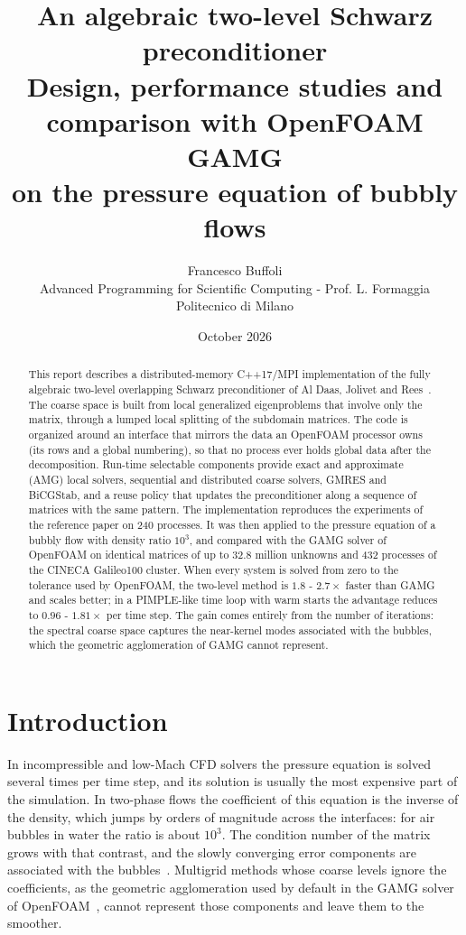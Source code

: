 \documentclass[11pt,a4paper]{article}
\title{\textbf{An algebraic two-level Schwarz preconditioner}\\[4pt]
\large Design, performance studies and comparison with OpenFOAM GAMG\\ on the pressure equation of bubbly flows}
\author{Francesco Buffoli\\[2pt]
\small Advanced Programming for Scientific Computing - Prof. L. Formaggia\\
\small Politecnico di Milano}
\date{October 2026}
\begin{document}
\maketitle

\begin{abstract}
\noindent
This report describes a distributed-memory C++17/MPI implementation of the fully
algebraic two-level overlapping Schwarz preconditioner of Al Daas, Jolivet and Rees~\cite{AlDaas2023}.
The coarse space is built from local generalized eigenproblems that involve only the matrix, through a
lumped local splitting of the subdomain matrices. The code is organized around an interface that mirrors
the data an OpenFOAM processor owns (its rows and a global numbering), so that no process ever holds
global data after the decomposition. Run-time selectable components provide exact and approximate (AMG)
local solvers, sequential and distributed coarse solvers, GMRES and BiCGStab, and a reuse policy that
updates the preconditioner along a sequence of matrices with the same pattern. The implementation
reproduces the experiments of the reference paper on 240 processes. It was then applied to the pressure
equation of a bubbly flow with density ratio $10^3$, and compared with the GAMG solver of OpenFOAM on
identical matrices of up to $32.8$ million unknowns and 432 processes of the CINECA Galileo100 cluster.
When every system is solved from zero to the tolerance used by OpenFOAM, the two-level method is
$1.8$ - $2.7\times$ faster than GAMG and scales better; in a PIMPLE-like time loop with warm starts the
advantage reduces to $0.96$ - $1.81\times$ per time step. The gain comes entirely from the number of
iterations: the spectral coarse space captures the near-kernel modes associated with the bubbles, which
the geometric agglomeration of GAMG cannot represent.
\end{abstract}

\tableofcontents

\section{Introduction}\label{sec:intro}

In incompressible and low-Mach CFD solvers the pressure equation is solved several times per time step,
and its solution is usually the most expensive part of the simulation. In two-phase flows the coefficient
of this equation is the inverse of the density, which jumps by orders of magnitude across the interfaces:
for air bubbles in water the ratio is about $10^3$. The condition number of the matrix grows with that
contrast, and the slowly converging error components are associated with the bubbles~\cite{MacLachlan2008}.
Multigrid methods whose coarse levels ignore the coefficients, as the geometric agglomeration used by
default in the GAMG solver of OpenFOAM~\cite{Weller1998}, cannot represent those components and leave
them to the smoother.
\end{document}
